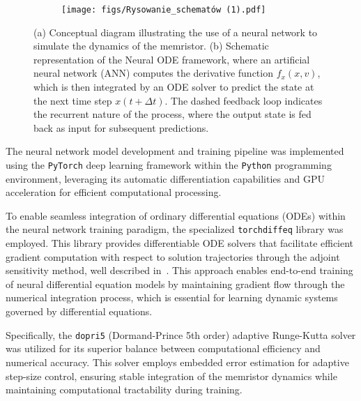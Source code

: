 \documentclass[11pt, oneside]{article}
\begin{document}
\begin{figure}[H]
    \centering
    \begin{subfigure}[b]{0.49\textwidth}
        \texttt{[image: figs/Rysowanie\_schematów (1).pdf]}
        \label{fig:nn_structure}
        \caption{}
    \end{subfigure}
    \begin{subfigure}[b]{0.49\textwidth}
        \resizebox{\linewidth}{!}{%
            
        }
        \caption{}
        \label{fig:nn_process}
    \end{subfigure}
    \hfill
    \caption{(a) Conceptual diagram illustrating the use of a neural network to simulate the dynamics of the memristor. (b) Schematic representation of the Neural ODE framework, where an artificial neural network (ANN) computes the derivative function $f_x(x,v)$, which is then integrated by an ODE solver to predict the state at the next time step $x(t + \Delta t)$. The dashed feedback loop indicates the recurrent nature of the process, where the output state is fed back as input for subsequent predictions.}
\end{figure}



The neural network model development and training pipeline was implemented using the \texttt{PyTorch} deep learning framework within the \texttt{Python} programming environment, leveraging its automatic differentiation capabilities and GPU acceleration for efficient computational processing.


To enable seamless integration of ordinary differential equations (ODEs) within the neural network training paradigm, the specialized \texttt{torchdiffeq} library was employed. This library provides differentiable ODE solvers that facilitate efficient gradient computation with respect to solution trajectories through the adjoint sensitivity method, well described in~\cite{Ricky2018}. This approach enables end-to-end training of neural differential equation models by maintaining gradient flow through the numerical integration process, which is essential for learning dynamic systems governed by differential equations.

Specifically, the \texttt{dopri5} (Dormand-Prince 5th order) adaptive Runge-Kutta solver was utilized for its superior balance between computational efficiency and numerical accuracy. This solver employs embedded error estimation for adaptive step-size control, ensuring stable integration of the memristor dynamics while maintaining computational tractability during training.
\end{document}
